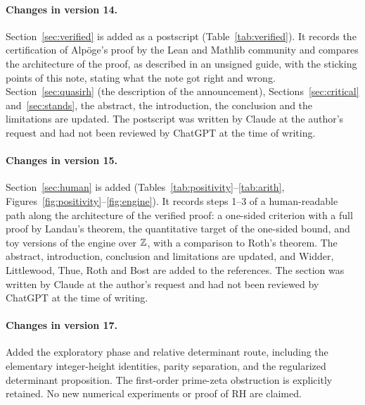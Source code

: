 \documentclass[11pt,a4paper]{article}
\theoremstyle{definition}\newtheorem{definition}[proposition]{Definition}
\theoremstyle{remark}\newtheorem{remark}[proposition]{Remark}
\begin{document}
\paragraph{Changes in version 14.} Section~\ref{sec:verified} is added as a postscript (Table~\ref{tab:verified}). It records the certification of Alp\"oge's proof by the Lean and Mathlib community and compares the architecture of the proof, as described in an unsigned guide, with the sticking points of this note, stating what the note got right and wrong. Section~\ref{sec:quasirh} (the description of the announcement), Sections~\ref{sec:critical} and~\ref{sec:stands}, the abstract, the introduction, the conclusion and the limitations are updated. The postscript was written by Claude at the author's request and had not been reviewed by ChatGPT at the time of writing.

\paragraph{Changes in version 15.} Section~\ref{sec:human} is added (Tables~\ref{tab:positivity}--\ref{tab:arith}, Figures~\ref{fig:positivity}--\ref{fig:engine}). It records steps 1--3 of a human-readable path along the architecture of the verified proof: a one-sided criterion with a full proof by Landau's theorem, the quantitative target of the one-sided bound, and toy versions of the engine over $\mathbb Z$, with a comparison to Roth's theorem. The abstract, introduction, conclusion and limitations are updated, and Widder, Littlewood, Thue, Roth and Bost are added to the references. The section was written by Claude at the author's request and had not been reviewed by ChatGPT at the time of writing.

\paragraph{Changes in version 17.} Added the exploratory phase and relative determinant route, including the elementary integer-height identities, parity separation, and the regularized determinant proposition. The first-order prime-zeta obstruction is explicitly retained. No new numerical experiments or proof of RH are claimed.
\end{document}
